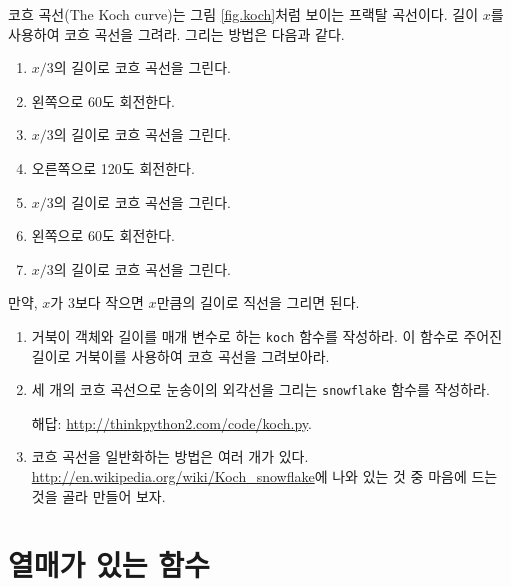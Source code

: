 \documentclass[10pt]{book}
\begin{document}
\begin{exercise}

코흐 곡선(The Koch curve)는 그림 \ref{fig.koch}처럼 보이는 프랙탈 곡선이다. 길이 $x$를 사용하여 코흐 곡선을 그려라.  그리는 방법은 다음과 같다.


\begin{enumerate}

\item $x/3$의 길이로 코흐 곡선을 그린다.

\item 왼쪽으로 60도 회전한다. 

\item $x/3$의 길이로 코흐 곡선을 그린다.

\item 오른쪽으로 120도 회전한다. 

\item $x/3$의 길이로 코흐 곡선을 그린다.

\item 왼쪽으로 60도 회전한다. 

\item $x/3$의 길이로 코흐 곡선을 그린다.

\end{enumerate}

만약, $x$가 3보다 작으면 $x$만큼의 길이로 직선을 그리면 된다. 

\begin{enumerate}

\item 거북이 객체와 길이를 매개 변수로 하는 {\tt koch} 함수를
  작성하라.  이 함수로 주어진 길이로 거북이를 사용하여 코흐 곡선을
  그려보아라.

\item 세 개의 코흐 곡선으로 눈송이의 외각선을 그리는 {\tt snowflake}
  함수를 작성하라.

해답: \url{http://thinkpython2.com/code/koch.py}.

\item 코흐 곡선을 일반화하는 방법은 여러 개가
  있다. \url{http://en.wikipedia.org/wiki/Koch_snowflake}에 나와 있는
  것 중 마음에 드는 것을 골라 만들어 보자.

\end{enumerate}
\end{exercise}


\chapter{열매가 있는 함수}
\label{fruitchap}
\end{document}
